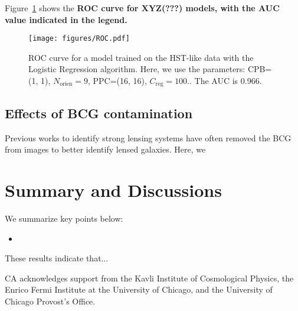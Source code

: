 \documentclass{emulateapj}
\newcommand{\todo}[1]{{\bf\color{blue} #1}}
\begin{document}
Figure~\ref{fig:ROC} shows the \todo{ROC curve for XYZ(???) models,
with the AUC value indicated in the legend.}

\begin{figure}[t]\label{fig:ROC}
\begin{center}
\texttt{[image: figures/ROC.pdf]}
\caption{ROC curve for a model trained on the HST-like data with the
  Logistic Regression algorithm.  Here, we use the parameters: CPB=(1,
  1), $N_\text{orien}=9$, PPC=(16, 16), $C_\text{reg}=100.$.  The AUC
  is 0.966.}
\end{center}
\end{figure}

\subsection{Effects of BCG contamination}

Previous works to identify strong lensing systems have often removed
the BCG from images to better identify lensed galaxies.  Here, we

\section{Summary and Discussions}
\label{sec:conclusions}

We summarize key points below:

\begin{itemize}

\item 
    
\end{itemize}

These results indicate that...

\acknowledgments CA acknowledges support from the Kavli Institute of
Cosmological Physics, the Enrico Fermi Institute at the University of
Chicago, and the University of Chicago Provost's Office.
\lastpagefootnotes



\end{document}
